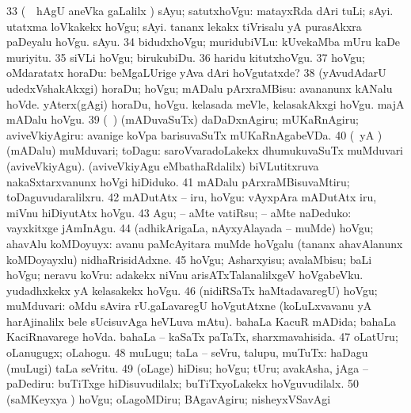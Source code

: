 {{\num{33} (\kanmu\ \BUkaq\ hAgU aneVka
\pagu gaLalilx \parx) sAyu; satutxhoVgu:  matayxRda dAri tuLi; sAyi. 
utatxma loVkakekx hoVgu; sAyi.  tananx lekakx
tiVrisalu yA purasAkxra paDeyalu hoVgu. sAyu. 
\num{34} bidudxhoVgu; muridubiVLu:
 kUvekaMba mUru kaDe muriyitu. 
\num{35} siVLi hoVgu; birukubiDu. 
\num{36} haridu kitutxhoVgu. 
\num{37} hoVgu; oMdaratatx
horaDu:  beMgaLUrige yAva dAri hoVgutatxde?
\num{38} (yAvudAdarU udedxVshakAkxgi) horaDu; hoVgu; mADalu pArxraMBisu:
 avananunx kANalu hoVde.  yAterx(gAgi) horaDu, hoVgu.  kelasada meVle, kelasakAkxgi hoVgu.
 majA mADalu hoVgu. 
\num{39} (\kanmu\ \AmA) (mADuvaSuTx)
daDaDxnAgiru; mUKaRnAgiru; aviveVkiyAgiru:  avanige
koVpa barisuvaSuTx mUKaRnAgabeVDa. 
\num{40} (\AmA\ yA \ame) (mADalu)
muMduvari; toDagu:  saroVvaradoLakekx dhumukuvaSuTx
muMduvari (aviveVkiyAgu).  (aviveVkiyAgu
eMbathaRdalilx) biVLutitxruva nakaSxtarxvanunx hoVgi hiDiduko. 
\num{41} mADalu pArxraMBisuvaMtiru; toDaguvudaralilxru. 
\num{42} mADutAtx -- iru, hoVgu:
 vAyxpAra mADutAtx iru, miVnu hiDiyutAtx hoVgu. 
\num{43} Agu; -- aMte vatiRsu; -- aMte naDeduko:  vayxkitxge jAmInAgu.
\num{44} (adhikArigaLa, nAyxyAlayada -- muMde) hoVgu; ahavAlu koMDoyuyx:  avanu paMcAyitara muMde hoVgalu (tananx ahavAlanunx
koMDoyayxlu) nidhaRrisidAdxne. 
\num{45} hoVgu; Asharxyisu; avalaMbisu; baLi
hoVgu; neravu koVru:  adakekx niVnu
arisATxTalanalilxgeV hoVgabeVku.  yudadhxkekx yA kelasakekx
hoVgu. 
\num{46} (nidiRSaTx haMtadavaregU) hoVgu; muMduvari:  oMdu sAvira rU.gaLavaregU hoVgutAtxne
(koLuLxvavanu yA harAjinalilx bele sUcisuvAga heVLuva mAtu).  bahaLa KacuR
mADida; bahaLa KaciRnavarege hoVda.  bahaLa -- kaSaTx
paTaTx, sharxmavahisida. 
\num{47} oLatUru; oLanugugx; oLahogu. 
\num{48} muLugu; taLa -- seVru, talupu, muTuTx:  haDagu
(muLugi) taLa seVritu. 
\num{49} (oLage) hiDisu; hoVgu; tUru; avakAsha, jAga -- paDediru:
 buTiTxge hiDisuvudilalx; buTiTxyoLakekx
hoVguvudilalx. 
\num{50} (saMKeyxya \vi) hoVgu; oLagoMDiru; BAgavAgiru; nisheyxVSavAgi
}}
